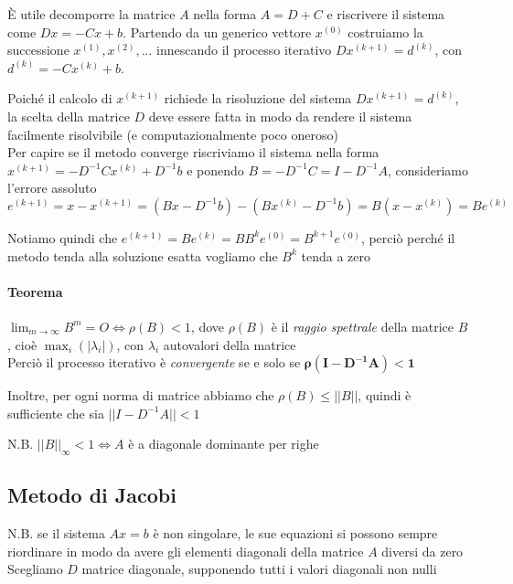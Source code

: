 \documentclass[openany]{book}
\begin{document}
È utile decomporre la matrice $A$ nella forma $A=D+C$ e riscrivere il sistema come $Dx=-Cx+b$. Partendo da un 
generico vettore $x^{(0)}$ costruiamo la successione $x^{(1)},x^{(2)},...$ innescando il processo iterativo 
$Dx^{(k+1)}=d^{(k)}$, con $d^{(k)}= -Cx^{(k)}+b$.

Poiché il calcolo di $x^{(k+1)}$ richiede la risoluzione del sistema $Dx^{(k+1)}=d^{(k)}$, la scelta della 
matrice $D$ deve essere fatta in modo da rendere il sistema facilmente risolvibile (e computazionalmente poco 
oneroso)
\\

Per capire se il metodo converge riscriviamo il sistema nella forma $x^{(k+1)}=-D^{-1}Cx^{(k)}+D^{-1}b$ e 
ponendo $B=-D^{-1}C=I-D^{-1}A$, consideriamo l'errore assoluto 
$e^{(k+1)}=x-x^{(k+1)}=(Bx-D^{-1}b)-(Bx^{(k)}-D^{-1}b)=B(x-x^{(k)})=Be^{(k)}$

Notiamo quindi che $e^{(k+1)}= Be^{(k)}=BB^{k}e^{(0)}=B^{k+1}e^{(0)}$, perciò perché il metodo tenda alla 
soluzione esatta vogliamo che $B^k$ tenda a zero

\paragraph{Teorema}

$\lim_{m\to\infty}B^m=O \Leftrightarrow \rho(B)<1$, dove $\rho(B)$ è il \textit{raggio spettrale} della 
matrice $B$, cioè $\max_i (|\lambda_i|)$, con $\lambda_i$ autovalori della matrice
\\

Perciò il processo iterativo è \textit{convergente} se e solo se $\boldsymbol{\rho(I-D^{-1}A)<1}$

Inoltre, per ogni norma di matrice abbiamo che $\rho(B)\leq||B||$, quindi è sufficiente che sia 
$||I-D^{-1}A||<1$

N.B. $||B||_\infty<1 \Leftrightarrow A$ è a diagonale dominante per righe
\subsection{Metodo di Jacobi}

N.B. se il sistema $Ax=b$ è non singolare, le sue equazioni si possono sempre riordinare in modo da avere gli 
elementi diagonali della matrice $A$ diversi da zero
\\

Scegliamo $D$ matrice diagonale, supponendo tutti i valori diagonali non nulli
\\
\end{document}
